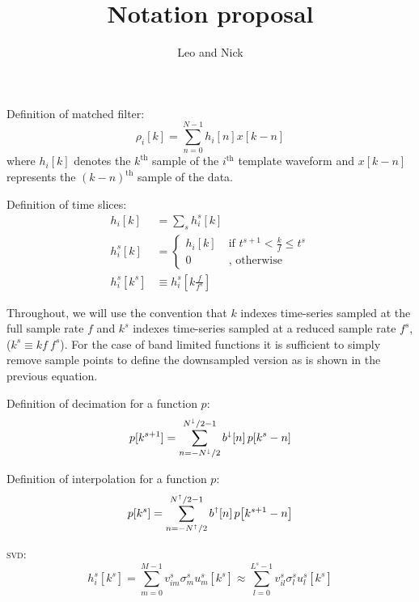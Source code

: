\documentclass[letterpaper,11pt]{article}
\title{Notation proposal}
\author{Leo and Nick}
\begin{document}
\maketitle

Definition of matched filter:
\begin{equation}
\rho_i [k] = \sum_{n=0}^{N-1} h_{i}[n] x [k-n]
\end{equation}
where $h_i[k]$ denotes the $k^{\mathrm{th}}$ sample of the $i^{\mathrm{th}}$
template waveform and $x[k-n]$ represents the $(k-n)^{\mathrm{th}}$ sample of
the data.

Definition of time slices:
\begin{align}
h_{i}[k] &= \sum_s h_{i}^{s}[k] \\
h_{i}^{s}[k] &= \left\{ \begin{aligned}
    h_{i}[k] & \; \text{if } t^{s+1} < \frac{k}{f} \leq t^{s} \\
    0 & \; \text{, otherwise }
    \end{aligned} \right. \\
h_{i}^{s}[k^{s}] &\equiv h_{i}^{s}\!\left[k\frac{f}{f^{s}}\right]
\end{align}

Throughout, we will use the convention that $k$ indexes time-series sampled at
the full sample rate $f$ and $k^s$ indexes time-series sampled at a reduced
sample rate $f^s$, ($k^{s} \equiv k f \ f^{s}$).  For the case of band limited
functions it is sufficient to simply remove sample points to define the
downsampled version as is shown in the previous equation.  

Definition of decimation for a function $p$:
\begin{equation}
p[k^{s+1}] = \sum_{n=-N^\shortdownarrow/2}^{N^\shortdownarrow/2-1} b^\shortdownarrow[n] \, p\!\left[k^{s}-n\right]
\end{equation}

Definition of interpolation for a function $p$:
\begin{equation}
p[k^{s}] = \sum_{n=-N^\shortuparrow/2}^{N^\shortuparrow/2-1} b^\shortuparrow[n] \, p\!\left[k^{s+1}-n\right]
\end{equation}

\textsc{svd}:
\begin{equation}
h^{s}_{i}\!\left[k^{s}\right] = \sum_{m=0}^{M-1} v^{s}_{im} \sigma^{s}_m u^{s}_{m}[k^{s}] \approx \sum_{l=0}^{L^s-1} v^{s}_{il} \sigma^{s}_l u^{s}_{l}[k^{s}]
\end{equation}
\end{document}
